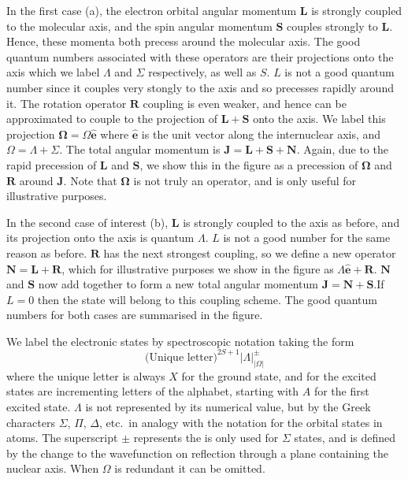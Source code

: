 In the first case (a), the electron orbital angular momentum $\mathbf{L}$ is
strongly coupled to the molecular axis, and the spin angular momentum
$\mathbf{S}$ couples strongly to $\mathbf{L}$. Hence, these momenta both
precess around the molecular axis. The good quantum numbers associated with
these operators are their projections onto the axis which we label $\Lambda$
and $\Sigma$  respectively, as well as $S$. $L$ is not a good quantum number
since it couples very stongly to the axis and so precesses rapidly around it.
%
The rotation operator $\mathbf{R}$ coupling is even weaker, and hence can be
approximated to couple to the projection of $\mathbf{L} + \mathbf{S}$ onto the
axis. We label this projection $\mathbf{\Omega} = \Omega \mathbf{\hat{e}}$
where $\mathbf{\hat{e}}$ is the unit vector along the internuclear axis, and $\Omega =
\Lambda + \Sigma$. The total angular momentum is $\mathbf{J} = \mathbf{L} +
\mathbf{S} + \mathbf{N}$. Again, due to the rapid precession of $\mathbf{L}$
and $\mathbf{S}$, we show this in the figure as a precession of
$\mathbf{\Omega}$ and $\mathbf{R}$ around $\mathbf{J}$. Note that
$\mathbf{\Omega}$ is not truly an operator, and is only useful for illustrative
purposes.

In the second case of interest (b), $\mathbf{L}$ is strongly coupled to the
axis as before, and its projection onto the axis is quantum $\Lambda$. $L$ is
not a good number for the same reason as before.  $\mathbf{R}$ has the next
strongest coupling, so we define a new operator $\mathbf{N} = \mathbf{L} +
\mathbf{R}$, which for illustrative purposes we show in the figure as $\Lambda
\mathbf{\hat{e}} + \mathbf{R}$.  $\mathbf{N}$ and $\mathbf{S}$ now add together
to form a new total angular momentum $\mathbf{J} = \mathbf{N} + \mathbf{S}$.If
$L=0$ then the state will belong to this coupling scheme.  The good quantum
numbers for both cases are summarised in the figure. 

We label the electronic states by spectroscopic notation taking the form
%
\begin{equation*} 
  \text{(Unique letter)}^{2S+1}|\Lambda|^\pm_{|\Omega|}
\end{equation*}
%
where the unique letter is always $X$ for the ground state, and for the excited
states are 
incrementing letters of the alphabet, starting with $A$ for the first
excited state. $\Lambda$ is not represented by its numerical value, but
by the Greek characters $\Sigma$, $\Pi$, $\Delta$, etc.\ in analogy with the
notation for the orbital states in atoms. The superscript $\pm$ represents the
is only used for $\Sigma$ states, and is defined by the change to
the wavefunction on reflection through a plane containing the nuclear axis.
When $\Omega$ is redundant it can be omitted.

